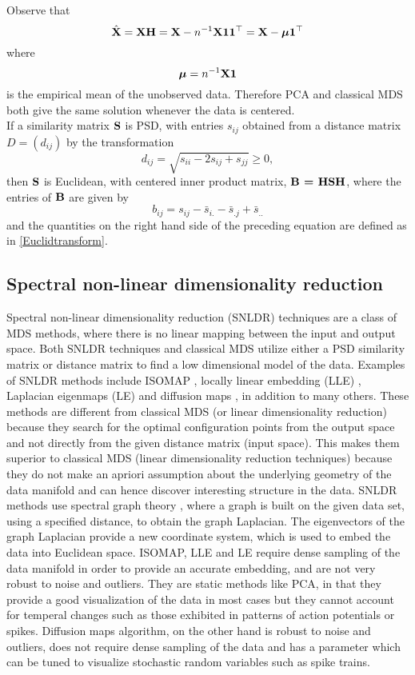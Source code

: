 Observe that 
\[ \hat{\textbf{X}} = \textbf{X}\textbf{H} = \textbf{X} - n^{-1} \textbf{X}\textbf{1}\textbf{1}^{\top} = \textbf{X} - \bm{\mu}\textbf{1}^{\top}
\]
where 
\[
\bm{\mu} = n^{-1} \textbf{X1}
\]
is the empirical mean of the unobserved data. Therefore PCA and classical MDS both give the same solution whenever the data is centered.\\

If a similarity matrix $\textbf{S}$ is PSD, with entries 
$s_{ij}$ obtained from a distance matrix $D = (d_{ij})$ by the transformation
\[ 
d_{ij} = \sqrt{s_{ii} - 2s_{ij} + s_{jj}} \geq 0,
\]
then $\textbf{S}$ is Euclidean, with centered inner product matrix, $\textbf{B = HSH}$, where the entries of $\textbf{B}$ are given by 
\[ 
b_{ij} = s_{ij} - \bar{s}_{i.} - \bar{s}_{.j} + \bar{s}_{..}
\]
and the quantities on the right hand side of the preceding equation are defined as in \eqref{Euclidtransform}.

\subsection{Spectral non-linear dimensionality reduction}
Spectral non-linear dimensionality reduction (SNLDR) techniques are a 
class of MDS methods, where there is no linear mapping between the 
input and output space. Both SNLDR techniques and classical MDS utilize
either a PSD similarity matrix or distance matrix to find a low dimensional
model of the data. Examples of SNLDR methods include ISOMAP \cite{TenenbaumJB2000Aggf}, locally linear embedding (LLE)  \cite{roweis2000nonlinear}, Laplacian eigenmaps (LE) \cite{belkin2003laplacian}
and diffusion maps \cite{belkin2003laplacian}, in addition to many others.
These methods are different from classical MDS (or linear dimensionality reduction) because they search for the optimal configuration points from the output space and not directly from the given distance matrix (input space). This makes them
superior to classical MDS (linear dimensionality reduction techniques) because they do not make an apriori assumption
about the underlying geometry of the data manifold and can hence discover 
interesting structure in the data.
SNLDR methods use spectral graph theory \cite{Luxburg2007}, where a graph is built on the given data set, using a specified distance, to obtain the graph Laplacian. The eigenvectors of the graph Laplacian provide a new coordinate system, which is used to embed the data into Euclidean space.
ISOMAP, LLE and LE require dense sampling of the data manifold in order to 
provide an accurate embedding, and are not very robust to noise and outliers.
They are static methods like PCA, in that they provide a good visualization of the data in most cases but they cannot account for temperal changes such as those exhibited in patterns of action potentials or spikes. Diffusion maps algorithm, on the other hand is robust to noise and outliers, does not require dense sampling of the data and has a parameter which can be tuned to visualize stochastic random variables such as spike trains.\\


